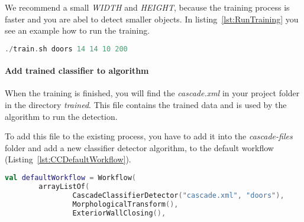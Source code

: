 We recommend a small \textit{WIDTH} and \textit{HEIGHT}, because the training process is faster and you are abel to detect smaller objects. In listing~\ref{lst:RunTraining} you see an example how to run the training.

\begin{lstlisting}[caption={Run training.}, label={lst:RunTraining}, language=Kotlin, escapechar=$]
./train.sh doors 14 14 10 200
\end{lstlisting}

\paragraph{Add trained classifier to algorithm}
When the training is finished, you will find the \textit{cascade.xml} in your project folder in the directory \textit{trained}. This file contains the trained data and is used by the algorithm to run the detection.

To add this file to the existing process, you have to add it into the \textit{cascade-files} folder and add a new classifier detector algorithm, to the default workflow (Listing~\ref{lst:CCDefaultWorkflow}).

\begin{lstlisting}[caption={New classifier in default worfklow.}, label={lst:CCDefaultWorkflow}, language=Kotlin, escapechar=$]
val defaultWorkflow = Workflow(
        arrayListOf(
                CascadeClassifierDetector("cascade.xml", "doors"),
                MorphologicalTransform(),
                ExteriorWallClosing(),
\end{lstlisting}
